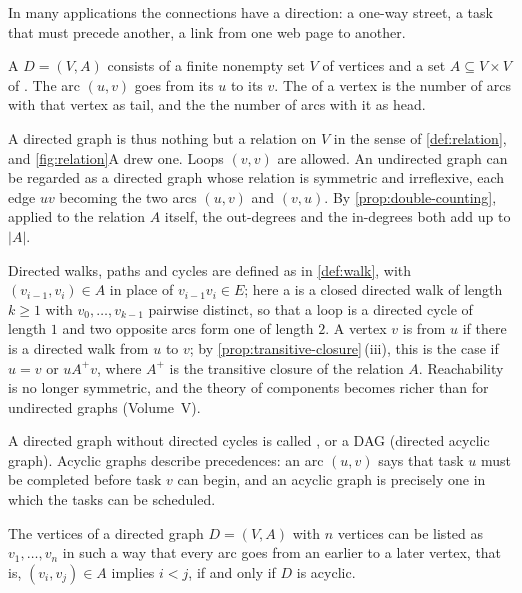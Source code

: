 In many applications the connections have a direction: a one-way street, a task that must precede another, a link from one web page to another.

\begin{definition}
\label{def:digraph}
A  $D=(V,A)$ consists of a finite nonempty set $V$ of vertices and a set $A\subseteq V\times V$ of . The arc $(u,v)$ goes from its  $u$ to its  $v$. The  of a vertex is the number of arcs with that vertex as tail, and the  the number of arcs with it as head.
\end{definition}

A directed graph is thus nothing but a relation on $V$ in the sense of \cref{def:relation}, and \cref{fig:relation}A drew one. Loops $(v,v)$ are allowed. An undirected graph can be regarded as a directed graph whose relation is symmetric and irreflexive, each edge $uv$ becoming the two arcs $(u,v)$ and $(v,u)$. By \cref{prop:double-counting}, applied to the relation $A$ itself, the out-degrees and the in-degrees both add up to $|A|$.

Directed walks, paths and cycles are defined as in \cref{def:walk}, with $(v_{i-1},v_i)\in A$ in place of $v_{i-1}v_i\in E$; here a  is a closed directed walk of length $k\ge1$ with $v_0,\ldots,v_{k-1}$ pairwise distinct, so that a loop is a directed cycle of length $1$ and two opposite arcs form one of length $2$. A vertex $v$ is  from $u$ if there is a directed walk from $u$ to $v$; by \cref{prop:transitive-closure}\,(iii), this is the case if $u=v$ or $u\mathrel{A^+}v$, where $A^+$ is the transitive closure of the relation $A$. Reachability is no longer symmetric, and the theory of components becomes richer than for undirected graphs (Volume~V).

A directed graph without directed cycles is called , or a DAG (directed acyclic graph). Acyclic graphs describe precedences: an arc $(u,v)$ says that task $u$ must be completed before task $v$ can begin, and an acyclic graph is precisely one in which the tasks can be scheduled.

\begin{proposition}
\label{prop:topological}
The vertices of a directed graph $D=(V,A)$ with $n$ vertices can be listed as $v_1,\ldots,v_n$ in such a way that every arc goes from an earlier to a later vertex, that is, $(v_i,v_j)\in A$ implies $i<j$, if and only if $D$ is acyclic.
\end{proposition}

